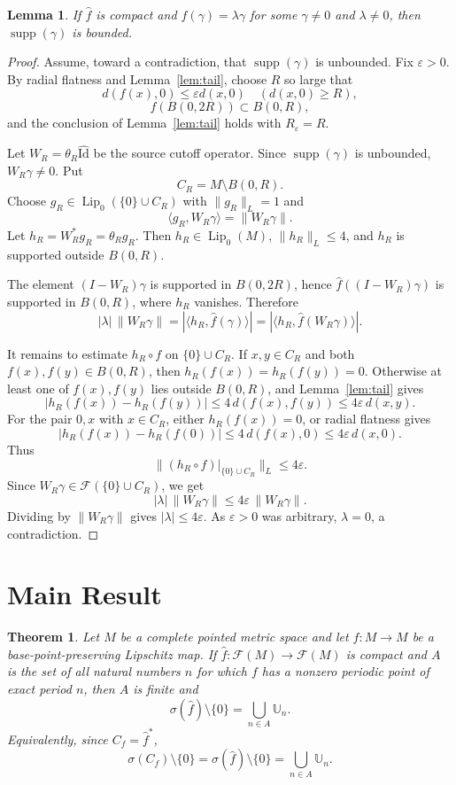 \documentclass[11pt]{article}
\newtheorem{theorem}{Theorem}
\newtheorem{lemma}{Lemma}
\newcommand{\F}{\mathcal F}
\newcommand{\Lip}{\operatorname{Lip}}
\newcommand{\supp}{\operatorname{supp}}
\newcommand{\U}{\mathbb U}
\newcommand{\eps}{\varepsilon}
\begin{document}
\begin{lemma}\label{lem:bounded-support}
If \(\widehat f\) is compact and
\(\widehat f(\gamma)=\lambda\gamma\) for some \(\gamma\ne0\) and
\(\lambda\ne0\), then \(\supp(\gamma)\) is bounded.
\end{lemma}

\begin{proof}
Assume, toward a contradiction, that \(\supp(\gamma)\) is unbounded.  Fix
\(\eps>0\).  By radial flatness and Lemma~\ref{lem:tail}, choose \(R\) so
large that
\[
d(f(x),0)\le \eps d(x,0)\quad(d(x,0)\ge R),
\]
\[
f(B(0,2R))\subset B(0,R),
\]
and the conclusion of Lemma~\ref{lem:tail} holds with \(R_\eps=R\).

Let \(W_R=\theta_R\widehat{\mathrm{Id}}\) be the source cutoff operator.
Since \(\supp(\gamma)\) is unbounded, \(W_R\gamma\ne0\).  Put
\[
C_R=M\setminus B(0,R).
\]
Choose \(g_R\in \Lip_0(\{0\}\cup C_R)\) with \(\|g_R\|_L=1\) and
\[
\langle g_R,W_R\gamma\rangle=\|W_R\gamma\|.
\]
Let \(h_R=W_R^*g_R=\theta_R g_R\).  Then \(h_R\in\Lip_0(M)\),
\(\|h_R\|_L\le4\), and \(h_R\) is supported outside \(B(0,R)\).

The element \((I-W_R)\gamma\) is supported in \(B(0,2R)\), hence
\(\widehat f((I-W_R)\gamma)\) is supported in \(B(0,R)\), where \(h_R\)
vanishes.  Therefore
\[
|\lambda|\,\|W_R\gamma\|
 = |\langle h_R,\widehat f(\gamma)\rangle|
 = |\langle h_R,\widehat f(W_R\gamma)\rangle|.
\]

It remains to estimate \(h_R\circ f\) on \(\{0\}\cup C_R\).  If
\(x,y\in C_R\) and both \(f(x),f(y)\in B(0,R)\), then
\(h_R(f(x))=h_R(f(y))=0\).  Otherwise at least one of \(f(x),f(y)\) lies
outside \(B(0,R)\), and Lemma~\ref{lem:tail} gives
\[
|h_R(f(x))-h_R(f(y))|
\le 4\,d(f(x),f(y))
\le 4\eps\,d(x,y).
\]
For the pair \(0,x\) with \(x\in C_R\), either \(h_R(f(x))=0\), or radial
flatness gives
\[
|h_R(f(x))-h_R(f(0))|
\le 4\,d(f(x),0)
\le 4\eps\,d(x,0).
\]
Thus
\[
\|(h_R\circ f)|_{\{0\}\cup C_R}\|_L\le 4\eps.
\]
Since \(W_R\gamma\in\F(\{0\}\cup C_R)\), we get
\[
|\lambda|\,\|W_R\gamma\|
 \le 4\eps\,\|W_R\gamma\|.
\]
Dividing by \(\|W_R\gamma\|\) gives \(|\lambda|\le4\eps\).  As \(\eps>0\)
was arbitrary, \(\lambda=0\), a contradiction.
\end{proof}

\section*{Main Result}

\begin{theorem}\label{thm:main}
Let \(M\) be a complete pointed metric space and let \(f:M\to M\) be a
base-point-preserving Lipschitz map.  If
\(\widehat f:\F(M)\to\F(M)\) is compact and \(A\) is the set of all natural
numbers \(n\) for which \(f\) has a nonzero periodic point of exact period
\(n\), then \(A\) is finite and
\[
\sigma(\widehat f)\setminus\{0\}=\bigcup_{n\in A}\U_n.
\]
Equivalently, since \(C_f=\widehat f^*\),
\[
\sigma(C_f)\setminus\{0\}=\sigma(\widehat f)\setminus\{0\}
=\bigcup_{n\in A}\U_n.
\]
\end{theorem}
\end{document}
